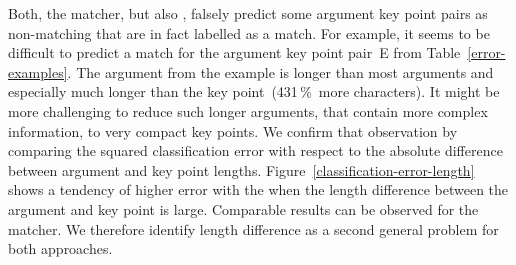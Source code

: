 Both, the \BertBase matcher, but also \RobertaBase, falsely predict some argument key point pairs as non-matching that are in 
fact labelled as a match.
For example, it seems to be difficult to predict a match for the argument key point pair~E from Table~\ref{error-examples}.
The argument from the example is longer than most arguments and especially much longer than the key point~(431\,\%~more characters).
It might be more challenging to reduce such longer arguments, that contain more complex information, to very compact key points.
We confirm that observation by comparing the squared classification error with respect to the absolute difference between 
argument and key point lengths.
Figure~\ref{classification-error-length} shows a tendency of higher error with the \BertBase when the length difference 
between the argument and key point is large.
Comparable results can be observed for the \RobertaBase matcher.
We therefore identify length difference as a second general problem for both approaches.
